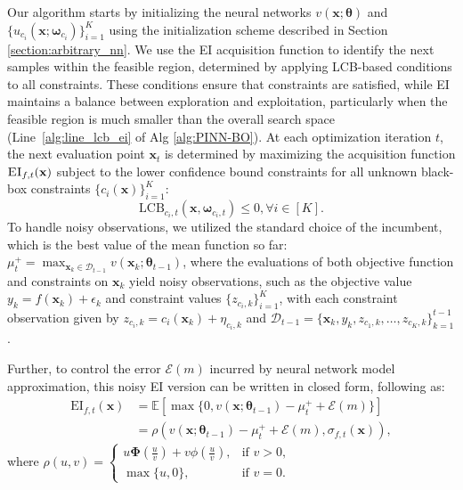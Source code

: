 Our algorithm starts by initializing the neural networks $v(\mathbf{x}; \boldsymbol{\theta})$ and $\{u_{c_i}(\mathbf{x}; \boldsymbol{\omega}_{c_i})\}_{i=1}^K$ using the initialization scheme described in Section \ref{section:arbitrary_nn}. We use the EI acquisition function to identify the next samples within the feasible region, determined by applying LCB-based conditions to all constraints. These conditions ensure that constraints are satisfied, while EI maintains a balance between exploration and exploitation, particularly when the feasible region is much smaller than the overall search space  (Line~\ref{alg:line_lcb_ei} of Alg \ref{alg:PINN-BO}). At each optimization iteration $t$, the next evaluation point $\mathbf{x}_t$ is determined by maximizing the acquisition function $\textsc{EI}_{f,t}(\mathbf{x})$ subject to the lower confidence bound constraints for all unknown black-box constraints $\{c_i(\mathbf{x})\}_{i=1}^K$:
\[
\text{LCB}_{c_i,t}(\mathbf{x}, \boldsymbol{\omega}_{c_i,t}) \le 0, \forall i \in [K].
\]
To handle noisy observations, we utilized the standard choice of the incumbent, which is
the best value of the mean function so far:
$\mu^+_t = \max_{\mathbf{x}_k \in \mathcal{D}_{t-1}} v(\mathbf{x}_k; \boldsymbol{\theta}_{t-1})$, where  
the evaluations of both objective function and constraints on $\mathbf{x}_k$ yield noisy observations, such as the objective value $y_k = f(\mathbf{x}_k) + \epsilon_k$ and constraint values $\{z_{c_i,k}\}_{i=1}^K$, with each constraint observation given by $z_{c_i,k} = c_i(\mathbf{x}_k) + \eta_{c_i,k}$ and $\mathcal{D}_{t-1} = \{\mathbf{x}_k, y_k, z_{c_1,k}, \dots, z_{{c_K}, k}\}_{k=1}^{t-1}$. 


Further, to control the error $\mathcal{E}(m)$ incurred by neural network model approximation, this noisy EI version can be written in closed form, following \citet{tran2022regret} as: 
\begin{align*}
    \text{EI}_{f,t}(\mathbf{x}) &= \mathbb{E}[\max \{0, v(\mathbf{x}; \boldsymbol{\theta}_{t-1}) - \mu^+_t + \mathcal{E}(m)\}]
    \\
    &= \rho (v(\mathbf{x}; \boldsymbol{\theta}_{t-1})- \mu^+_t + \mathcal{E}(m), \sigma_{f,t}(\mathbf{x})), 
\end{align*}
where $
  \rho(u,v) =
    \begin{cases}
      u \boldsymbol{\Phi}(\frac{u}{v}) + v \phi(\frac{u}{v}), & \text{if } v>0,
      \\
      \max \{u, 0\}, & \text{if } v=0.
    \end{cases}       
$
 

